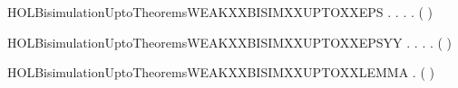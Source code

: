 \newcommand{\HOLBisimulationUptoTheoremsWEAKXXBISIMXXUPTOXXALTXXWEAKXXTRANSXXtauYY}{\UseVerbatim{HOLBisimulationUptoTheoremsWEAKXXBISIMXXUPTOXXALTXXWEAKXXTRANSXXtauYY}}
\begin{SaveVerbatim}{HOLBisimulationUptoTheoremsWEAKXXBISIMXXUPTOXXEPS}
\HOLTokenTurnstile{} \HOLSymConst{\HOLTokenForall{}}.
         \HOLSymConst{\HOLTokenImp{}}
       \HOLSymConst{\HOLTokenForall{}} .
              \HOLSymConst{\HOLTokenImp{}}
           \HOLSymConst{\HOLTokenForall{}}.
                  \HOLSymConst{\HOLTokenImp{}}
               \HOLSymConst{\HOLTokenExists{}}.
                      \HOLSymConst{\HOLTokenConj{}}
                   (    )  
\end{SaveVerbatim}
\newcommand{\HOLBisimulationUptoTheoremsWEAKXXBISIMXXUPTOXXEPS}{\UseVerbatim{HOLBisimulationUptoTheoremsWEAKXXBISIMXXUPTOXXEPS}}
\begin{SaveVerbatim}{HOLBisimulationUptoTheoremsWEAKXXBISIMXXUPTOXXEPSYY}
\HOLTokenTurnstile{} \HOLSymConst{\HOLTokenForall{}}.
         \HOLSymConst{\HOLTokenImp{}}
       \HOLSymConst{\HOLTokenForall{}} .
              \HOLSymConst{\HOLTokenImp{}}
           \HOLSymConst{\HOLTokenForall{}}.
                  \HOLSymConst{\HOLTokenImp{}}
               \HOLSymConst{\HOLTokenExists{}}.
                      \HOLSymConst{\HOLTokenConj{}}
                   (    )  
\end{SaveVerbatim}
\newcommand{\HOLBisimulationUptoTheoremsWEAKXXBISIMXXUPTOXXEPSYY}{\UseVerbatim{HOLBisimulationUptoTheoremsWEAKXXBISIMXXUPTOXXEPSYY}}
\begin{SaveVerbatim}{HOLBisimulationUptoTheoremsWEAKXXBISIMXXUPTOXXLEMMA}
\HOLTokenTurnstile{} \HOLSymConst{\HOLTokenForall{}}.
         \HOLSymConst{\HOLTokenImp{}}
        (    )
\end{SaveVerbatim}

